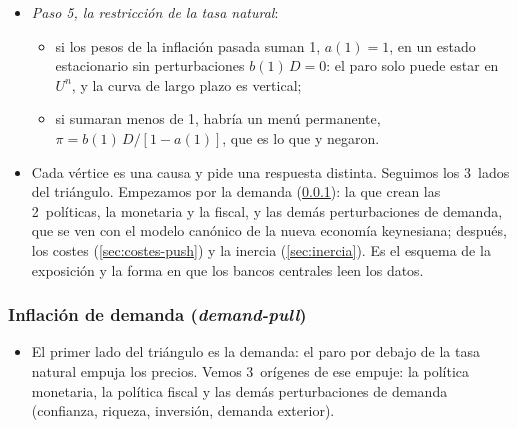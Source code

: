 \documentclass[11pt]{article}
\begin{document}
\begin{anotaciones}
\begin{itemize}
\begin{itemize}
  \end{itemize}
\item \emph{Paso 5, la restricción de la tasa natural}:
  \begin{itemize}
  \item si los pesos de la inflación pasada suman 1, $a(1)=1$, en un estado estacionario sin perturbaciones $b(1)\,D=0$: el paro solo puede estar en $U^n$, y la curva de largo plazo es vertical;
  \item si sumaran menos de 1, habría un menú permanente, $\pi=b(1)\,D/[1-a(1)]$, que es lo que  y  negaron.
  \end{itemize}
\end{itemize}
\end{anotaciones}

\begin{infografia}[H]
\centering
\caption{De dónde viene la inflación: el triángulo de }\label{figu:esquema-inflacion}
\end{infografia}

\begin{itemize}
\item Cada vértice es una causa y pide una respuesta distinta. Seguimos los 3~lados del triángulo. Empezamos por la demanda (\ref{sec:demanda}): la que crean las 2~políticas, la monetaria y la fiscal, y las demás perturbaciones de demanda, que se ven con el modelo canónico de la nueva economía keynesiana; después, los costes (\ref{sec:costes-push}) y la inercia (\ref{sec:inercia}). Es el esquema de la exposición y la forma en que los bancos centrales leen los datos.
\end{itemize}

\subsubsection{Inflación de demanda (\emph{demand-pull})}\label{sec:demanda}

\begin{itemize}
\item El primer lado del triángulo es la demanda: el paro por debajo de la tasa natural empuja los precios. Vemos 3~orígenes de ese empuje: la política monetaria, la política fiscal y las demás perturbaciones de demanda (confianza, riqueza, inversión, demanda exterior).
\end{itemize}
\end{document}
